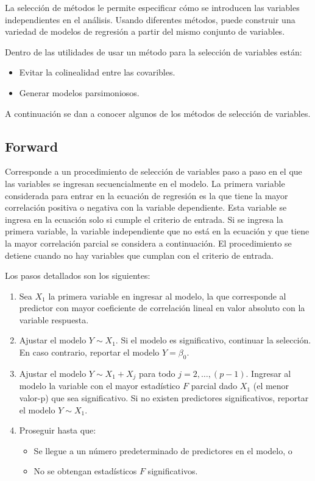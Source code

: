 \documentclass[
  11pt,
]{book}
\providecommand{\tightlist}{%
  \setlength{\itemsep}{0pt}\setlength{\parskip}{0pt}}
\theoremstyle{definition}
\theoremstyle{definition}
\theoremstyle{definition}
\theoremstyle{definition}
\theoremstyle{remark}
\begin{document}
La selección de métodos le permite especificar cómo se introducen las variables independientes en el análisis. Usando diferentes métodos, puede construir una variedad de modelos de regresión a partir del mismo conjunto de variables.

Dentro de las utilidades de usar un método para la selección de variables están:

\begin{itemize}
\tightlist
\item
  Evitar la colinealidad entre las covaribles.
\item
  Generar modelos parsimoniosos.
\end{itemize}

A continuación se dan a conocer algunos de los métodos de selección de variables.

\subsection{Forward}\label{forward}

Corresponde a un procedimiento de selección de variables paso a paso en el que las variables se ingresan secuencialmente en el modelo. La primera variable considerada para entrar en la ecuación de regresión es la que tiene la mayor correlación positiva o negativa con la variable dependiente. Esta variable se ingresa en la ecuación solo si cumple el criterio de entrada. Si se ingresa la primera variable, la variable independiente que no está en la ecuación y que tiene la mayor correlación parcial se considera a continuación. El procedimiento se detiene cuando no hay variables que cumplan con el criterio de entrada.

Los pasos detallados son los siguientes:

\begin{enumerate}
\def\labelenumi{\arabic{enumi}.}
\tightlist
\item
  Sea \(X_1\) la primera variable en ingresar al modelo, la que corresponde al predictor con mayor coeficiente de correlación lineal en valor absoluto con la variable respuesta.
\item
  Ajustar el modelo \(Y \sim X_1\). Si el modelo es significativo, continuar la selección. En caso contrario, reportar el modelo \(Y = \beta_0\).
\item
  Ajustar el modelo \(Y \sim X_1 + X_j\) para todo \(j = 2, \ldots , (p -1)\). Ingresar al modelo la variable con el mayor estadístico \(F\) parcial dado \(X_1\) (el menor valor-p) que sea significativo. Si no existen predictores significativos, reportar el modelo \(Y \sim X_1\).
\item
  Proseguir hasta que:

  \begin{itemize}
  \tightlist
  \item
    Se llegue a un número predeterminado de predictores en el modelo, o
  \item
    No se obtengan estadísticos \(F\) significativos.
  \end{itemize}
\end{enumerate}
\end{document}

